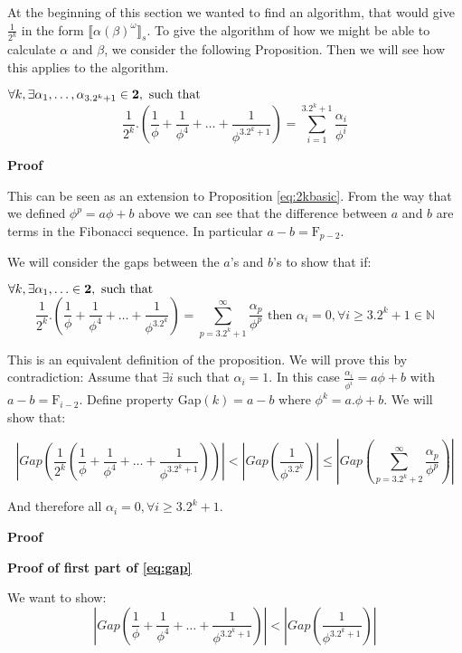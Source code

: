 \documentclass{cs4rep}
\begin{document}
At the beginning of this section we wanted to find an algorithm, that
would give $\frac{1}{2^{k}}$ in the form $\llbracket
\alpha(\beta)^{\omega} \rrbracket_{s}$. To give the algorithm of how
we might be able to calculate $\alpha$ and $\beta$, we consider the
following Proposition.  Then we will see how this applies to the
algorithm.

\begin{myprop} \label{con:frac}
$ \forall k, \exists \alpha_{1},\ldots,\alpha_{3.2^{k}+1} \in {\bf 2}, \mbox{ such that } $
\[ \frac{1}{2^{k}}.(\frac{1}{\phi} + \frac{1}{\phi^{4}} + \ldots + \frac{1}{\phi^{3.2^{k}+1}}) = \sum_{i=1}^{3.2^{k}+1} \frac{\alpha_{i}}{\phi^{i}} \]
\end{myprop}

{\bf Proof}

This can be seen as an extension to Proposition \ref{eq:2kbasic}.
From the way that we defined $\phi^{p} = a\phi + b$ above we can see
that the difference between $a$ and $b$ are terms in the Fibonacci
sequence. In particular $ a-b = \mbox{F}_{p-2} $.

We will consider the gaps between the $a$'s and $b$'s to show that if:

$ \forall k, \exists \alpha_{1},\ldots \in {\bf 2}, \mbox{ such that } $
\[ \frac{1}{2^{k}}.(\frac{1}{\phi} + \frac{1}{\phi^{4}} + \ldots + \frac{1}{\phi^{3.2^{k}}}) = \sum_{p=3.2^{k}+1}^{\infty} \frac{\alpha_{p}}{\phi^{p}} \mbox{ then } \alpha_{i} = 0, \forall i \geq 3.2^{k}+1 \in \mathbb{N} \]

This is an equivalent definition of the proposition. We will prove
this by contradiction: Assume that $\exists i$ such that $\alpha_{i} =
1$. In this case $\frac{\alpha_{i}}{\phi^{i}} = a\phi + b $ with $a-b
= \mbox{F}_{i-2}$. Define property Gap$(k) = a-b$ where $\phi^{k} =
a.\phi + b$. We will show that:

\begin{equation}
 | Gap(\frac{1}{2^{k}}(\frac{1}{\phi} + \frac{1}{\phi^{4}} + \ldots + \frac{1}{\phi^{3.2^{k}+1}})) | < | Gap(\frac{1}{\phi^{3.2^{k}}}) | \leq | Gap(\sum_{p=3.2^{k}+2}^{\infty} \frac{\alpha_{p}}{\phi^{p}}) | \label{eq:gap}
\end{equation}

And therefore all $\alpha_{i} = 0, \forall i \geq 3.2^{k}+1$.

{\bf Proof}

{\bf Proof of first part of \ref{eq:gap}}

We want to show:
\begin{equation}
|Gap(\frac{1}{\phi}+\frac{1}{\phi^{4}} + \ldots + \frac{1}{\phi^{3.2^{k}+1}})| < |Gap(\frac{1}{\phi^{3.2^{k}+1}})| \label{eq:gap1}
\end{equation}
\end{document}
